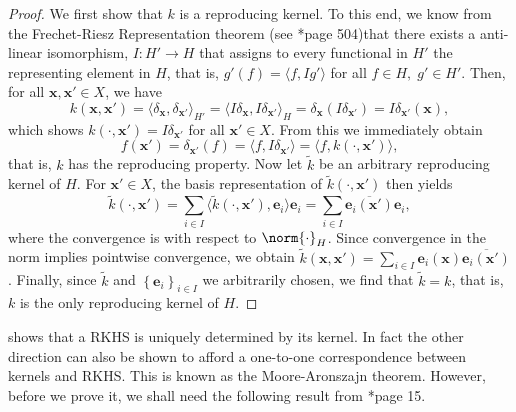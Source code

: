 \begin{proof}
    We first show that $k$ is a reproducing kernel. To this end, we know from the Frechet-Riesz Representation theorem (see \cite{SteinwartIngo2008SVMb}*{page 504})that there exists a anti-linear isomorphism, $I : H' \to H$ that assigns to every functional in $H'$ the representing element in $H$, that is, $g'(f) = \langle f , I g' \rangle$ for all $f \in H, \; g' \in H'$. Then, for all $\bm{x} , \bm{x}' \in X$, we have
    \begin{equation*}
        k \left( \bm{x} , \bm{x}' \right) = \langle \delta_{\bm{x}} , \delta_{\bm{x}'} \rangle_{H'} = \langle I \delta_{\bm{x}} , I \delta_{\bm{x}'} \rangle_{H} = \delta_{\bm{x}} \left( I \delta_{\bm{x}'} \right) = I \delta_{\bm{x}'} (\bm{x}),
    \end{equation*}
    which shows $k \left( \cdot , \bm{x}' \right) = I \delta_{\bm{x}'}$ for all $\bm{x}' \in X$. From this we immediately obtain
    \begin{equation*}
        f(\bm{x}') = \delta_{\bm{x}'} (f) = \langle f , I \delta_{\bm{x}'} \rangle = \langle f , k \left( \cdot , \bm{x}' \right) \rangle,
    \end{equation*}
    that is, $k$ has the reproducing property. Now let $\tilde{k}$ be an arbitrary reproducing kernel of $H$. For $\bm{x}' \in X$, the basis representation of $\tilde{k} \left( \cdot , \bm{x}' \right)$ then yields
    \begin{equation*}
        \tilde{k} \left( \cdot , \bm{x}' \right) = \sum_{i \in I} \langle \tilde{k} (\cdot , \bm{x}'), \bm{e}_{i} \rangle \bm{e}_{i} = \sum_{i \in I} \overline{\bm{e}_{i} (\bm{x}')} \bm{e}_{i},
    \end{equation*}
    where the convergence is with respect to $\norm{\cdot}_H$. Since convergence in the norm implies pointwise convergence, we obtain $\tilde{k} \left( \bm{x} , \bm{x}' \right) = \sum_{i \in I} \bm{e}_{i} (\bm{x}) \overline{\bm{e}_{i} (\bm{x}')}$. Finally, since $\tilde{k}$ and $\left\{ \bm{e}_{i} \right\}_{i\in I}$ we arbitrarily chosen, we find that $\tilde{k} = k$, that is, $k$ is the only reproducing kernel of $H$.
\end{proof}

 shows that a RKHS is uniquely determined by its kernel. In fact the other direction can also be shown to afford a one-to-one correspondence between kernels and RKHS. This is known as the Moore-Aronszajn theorem. However, before we prove it, we shall need the following result from \cite{BerlinetAlain2003RKHS}*{page 15}.

